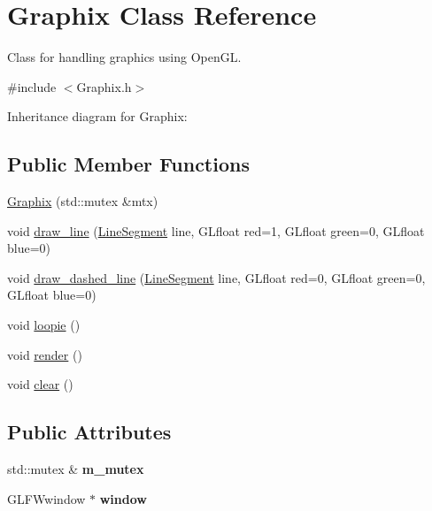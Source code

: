 \hypertarget{classGraphix}{}\section{Graphix Class Reference}
\label{classGraphix}


Class for handling graphics using Open\+GL.  




{\ttfamily \#include $<$Graphix.\+h$>$}



Inheritance diagram for Graphix\+:
\subsection*{Public Member Functions}
\begin{DoxyCompactItemize}
\item 
\hyperlink{classGraphix_a1d4cb173e0d22fee13a657489b7b55de}{Graphix} (std\+::mutex \&mtx)
\item 
void \hyperlink{classGraphix_a74af1cd957a0fc3b5e0ee1f951a994e1}{draw\+\_\+line} (\hyperlink{classLineSegment}{Line\+Segment} line, G\+Lfloat red=1, G\+Lfloat green=0, G\+Lfloat blue=0)
\item 
void \hyperlink{classGraphix_a9a1ebf0c6d508ce4686b9794c4dec871}{draw\+\_\+dashed\+\_\+line} (\hyperlink{classLineSegment}{Line\+Segment} line, G\+Lfloat red=0, G\+Lfloat green=0, G\+Lfloat blue=0)
\item 
void \hyperlink{classGraphix_af7b539b3ab40274dc2f89d060cba0c51}{loopie} ()
\item 
void \hyperlink{classGraphix_a3e24075d5ded3741a9c14a7978b721d8}{render} ()
\item 
void \hyperlink{classGraphix_a1ac1a5725a869ef074da6fe3cab29b0e}{clear} ()
\end{DoxyCompactItemize}
\subsection*{Public Attributes}
\begin{DoxyCompactItemize}
\item 
\mbox{\label{classGraphix_ab2136667d30ca5f0017bceded579a803}} 
std\+::mutex \& {\bfseries m\+\_\+mutex}
\item 
\mbox{\label{classGraphix_a8189df95428d2fda74b1becb84ed07c2}} 
G\+L\+F\+Wwindow $\ast$ {\bfseries window}
\end{DoxyCompactItemize}
